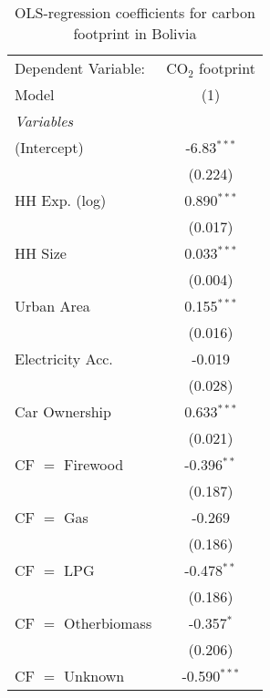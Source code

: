 
\begin{table}[htbp!]
   \centering
   \small
   \begin{adjustbox}{width = 1\textwidth, max height = 0.95\textheight, center}
      \begin{threeparttable}[b]
         \caption{\label{tab:OLS_2_BOL} OLS-regression coefficients for carbon footprint in Bolivia}
         \begin{tabular}{lc}
            \tabularnewline \midrule \midrule
            Dependent Variable: & CO$_{2}$ footprint\\  
            Model               & (1)\\  
            \midrule
            \emph{Variables}\\
            (Intercept)         & -6.83$^{***}$\\   
                                & (0.224)\\   
            HH Exp. (log)       & 0.890$^{***}$\\   
                                & (0.017)\\   
            HH Size             & 0.033$^{***}$\\   
                                & (0.004)\\   
            Urban Area          & 0.155$^{***}$\\   
                                & (0.016)\\   
            Electricity Acc.    & -0.019\\   
                                & (0.028)\\   
            Car Ownership       & 0.633$^{***}$\\   
                                & (0.021)\\   
            CF $=$ Firewood     & -0.396$^{**}$\\   
                                & (0.187)\\   
            CF $=$ Gas          & -0.269\\   
                                & (0.186)\\   
            CF $=$ LPG          & -0.478$^{**}$\\   
                                & (0.186)\\   
            CF $=$ Otherbiomass & -0.357$^{*}$\\   
                                & (0.206)\\   
            CF $=$ Unknown      & -0.590$^{***}$\\   

\end{tabular}
\end{threeparttable}
\end{adjustbox}
\end{table}
